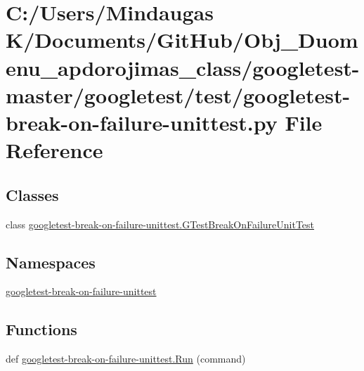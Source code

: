 \hypertarget{googletest-master_2googletest_2test_2googletest-break-on-failure-unittest_8py}{}\section{C\+:/\+Users/\+Mindaugas K/\+Documents/\+Git\+Hub/\+Obj\+\_\+\+Duomenu\+\_\+apdorojimas\+\_\+class/googletest-\/master/googletest/test/googletest-\/break-\/on-\/failure-\/unittest.py File Reference}
\label{googletest-master_2googletest_2test_2googletest-break-on-failure-unittest_8py}
\subsection*{Classes}
\begin{DoxyCompactItemize}
\item 
class \mbox{\hyperlink{classgoogletest-break-on-failure-unittest_1_1_g_test_break_on_failure_unit_test}{googletest-\/break-\/on-\/failure-\/unittest.\+G\+Test\+Break\+On\+Failure\+Unit\+Test}}
\end{DoxyCompactItemize}
\subsection*{Namespaces}
\begin{DoxyCompactItemize}
\item 
 \mbox{\hyperlink{namespacegoogletest-break-on-failure-unittest}{googletest-\/break-\/on-\/failure-\/unittest}}
\end{DoxyCompactItemize}
\subsection*{Functions}
\begin{DoxyCompactItemize}
\item 
def \mbox{\hyperlink{namespacegoogletest-break-on-failure-unittest_a1af5bbcd251e90355ddcd17d0e0e6147}{googletest-\/break-\/on-\/failure-\/unittest.\+Run}} (command)
\end{DoxyCompactItemize}
